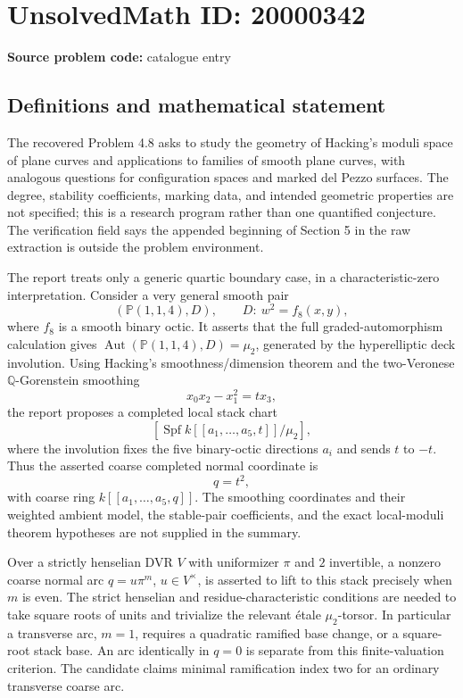 \documentclass[11pt]{article}
\newcommand{\Q}{\mathbb{Q}}
\newcommand{\PP}{\mathbb{P}}
\begin{document}
\section*{UnsolvedMath ID: 20000342}
\textbf{Source problem code:} catalogue entry
\subsection{Definitions and mathematical statement}
The recovered Problem 4.8 asks to study the geometry of Hacking's moduli space of plane curves and applications to families of smooth plane curves, with analogous questions for configuration spaces and marked del Pezzo surfaces. The degree, stability coefficients, marking data, and intended geometric properties are not specified; this is a research program rather than one quantified conjecture. The verification field says the appended beginning of Section 5 in the raw extraction is outside the problem environment.

The report treats only a generic quartic boundary case, in a characteristic-zero interpretation. Consider a very general smooth pair
\[
(\PP(1,1,4),D),\qquad D:\ w^2=f_8(x,y),
\]
where \(f_8\) is a smooth binary octic. It asserts that the full graded-automorphism calculation gives \(\operatorname{Aut}(\PP(1,1,4),D)=\mu_2\), generated by the hyperelliptic deck involution. Using Hacking's smoothness/dimension theorem and the two-Veronese \(\Q\)-Gorenstein smoothing
\[
x_0x_2-x_1^2=t x_3,
\]
the report proposes a completed local stack chart
\[
\left[\operatorname{Spf}k[[a_1,\ldots,a_5,t]]/\mu_2\right],
\]
where the involution fixes the five binary-octic directions \(a_i\) and sends \(t\) to \(-t\). Thus the asserted coarse completed normal coordinate is
\[
q=t^2,
\]
with coarse ring \(k[[a_1,\ldots,a_5,q]]\). The smoothing coordinates and their weighted ambient model, the stable-pair coefficients, and the exact local-moduli theorem hypotheses are not supplied in the summary.

Over a strictly henselian DVR \(V\) with uniformizer \(\pi\) and \(2\) invertible, a nonzero coarse normal arc \(q=u\pi^m\), \(u\in V^\times\), is asserted to lift to this stack precisely when \(m\) is even. The strict henselian and residue-characteristic conditions are needed to take square roots of units and trivialize the relevant \'etale \(\mu_2\)-torsor. In particular a transverse arc, \(m=1\), requires a quadratic ramified base change, or a square-root stack base. An arc identically in \(q=0\) is separate from this finite-valuation criterion. The candidate claims minimal ramification index two for an ordinary transverse coarse arc.
\end{document}
